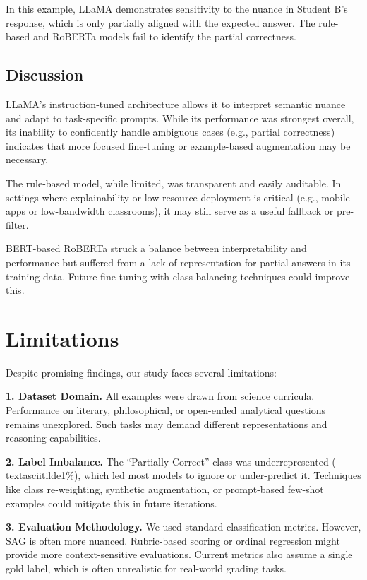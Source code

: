 \documentclass[11pt]{article}
\begin{document}
In this example, LLaMA demonstrates sensitivity to the nuance in Student B’s response, which is only partially aligned with the expected answer. The rule-based and RoBERTa models fail to identify the partial correctness.

\subsection{Discussion}
LLaMA’s instruction-tuned architecture allows it to interpret semantic nuance and adapt to task-specific prompts. While its performance was strongest overall, its inability to confidently handle ambiguous cases (e.g., partial correctness) indicates that more focused fine-tuning or example-based augmentation may be necessary.

The rule-based model, while limited, was transparent and easily auditable. In settings where explainability or low-resource deployment is critical (e.g., mobile apps or low-bandwidth classrooms), it may still serve as a useful fallback or pre-filter.

BERT-based RoBERTa struck a balance between interpretability and performance but suffered from a lack of representation for partial answers in its training data. Future fine-tuning with class balancing techniques could improve this.

\section{Limitations}
Despite promising findings, our study faces several limitations:

\textbf{1. Dataset Domain.} All examples were drawn from science curricula. Performance on literary, philosophical, or open-ended analytical questions remains unexplored. Such tasks may demand different representations and reasoning capabilities.

\textbf{2. Label Imbalance.} The “Partially Correct” class was underrepresented (\\textasciitilde1\%), which led most models to ignore or under-predict it. Techniques like class re-weighting, synthetic augmentation, or prompt-based few-shot examples could mitigate this in future iterations.

\textbf{3. Evaluation Methodology.} We used standard classification metrics. However, SAG is often more nuanced. Rubric-based scoring or ordinal regression might provide more context-sensitive evaluations. Current metrics also assume a single gold label, which is often unrealistic for real-world grading tasks.
\end{document}
